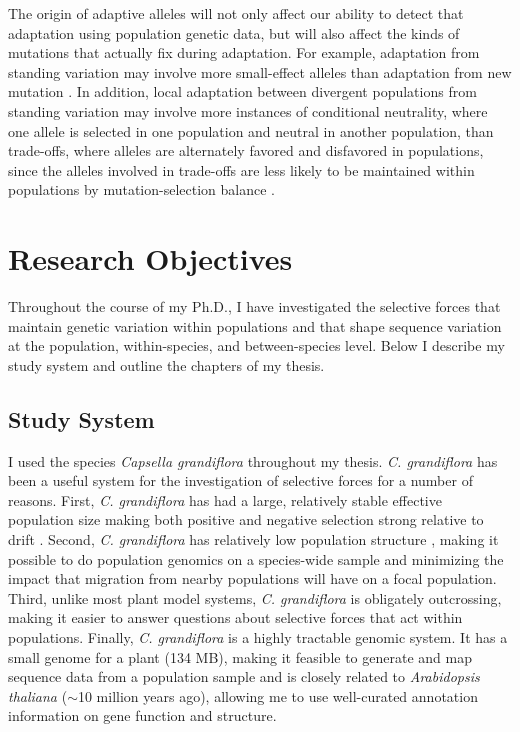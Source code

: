 The origin of adaptive alleles will not only affect our ability to detect that adaptation using population genetic data, but will also affect the kinds of mutations that actually fix during adaptation. For example, adaptation from standing variation may involve more small-effect alleles than adaptation from new mutation \citep{Orr2001-fq}. In addition, local adaptation between divergent populations from standing variation may involve more instances of conditional neutrality, where one allele is selected in one population and neutral in another population, than trade-offs, where alleles are alternately favored and disfavored in populations, since the alleles involved in trade-offs are less likely to be maintained within populations by mutation-selection balance \citep{Anderson2011-hs}. 

\section{Research Objectives}

Throughout the course of my Ph.D., I have investigated the selective forces that maintain genetic variation within populations and that shape sequence variation at the population, within-species, and between-species level. Below I describe my study system and outline the chapters of my thesis.

\subsection{Study System}
I used the species \textit{Capsella grandiflora} throughout my thesis. \textit{C. grandiflora} has been a useful system for the investigation of selective forces for a number of reasons. First, \textit{C. grandiflora} has had a large, relatively stable effective population size making both positive and negative selection strong relative to drift \citep{Slotte2010-gw}. Second, \textit{C. grandiflora} has relatively low population structure \citep{St_onge2011-jz}, making it possible to do population genomics on a species-wide sample and minimizing the impact that migration from nearby populations will have on a focal population. Third, unlike most plant model systems, \textit{C. grandiflora} is obligately outcrossing, making it easier to answer questions about selective forces that act within populations. Finally, \textit{C. grandiflora} is a highly tractable genomic system. It has a small genome for a plant (134 MB), making it feasible to generate and map sequence data from a population sample and is closely related to \textit{Arabidopsis thaliana} ($\sim$10 million years ago), allowing me to use well-curated annotation information on gene function and structure.

